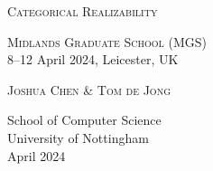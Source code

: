 \begin{titlepage}
  \large


  \vspace{6ex}

  \parbox{0.2\textwidth}{\makeicon[0.5]}
  \hfill
  \parbox{0.7\textwidth}{\huge\textsc{Categorical Realizability}}

  \vspace{2ex}

  \flushright

  {\Large\textsc{Midlands Graduate School (MGS)}} \\[1.4ex]
  8--12 April 2024, Leicester, UK

  \vfill

  \textsc{Joshua Chen \& Tom de Jong}

  \vspace{4ex}

  {\normalsize{School of Computer Science \\
  University of Nottingham \\
  April 2024}}

  \vspace{0.5cm}

\end{titlepage}